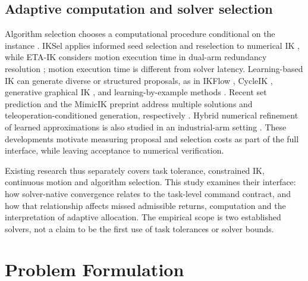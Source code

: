 \documentclass[10pt,a4paper]{article}
\begin{document}
\subsection{Adaptive computation and solver selection}

Algorithm selection chooses a computational procedure conditional on the instance
\cite{rice1976selection,bischl2016aslib}. IKSel applies informed seed selection
and reselection to numerical IK \cite{yuan2025iksel}, while ETA-IK considers
motion execution time in dual-arm redundancy resolution
\cite{tang2025etaik}; motion execution time is different from solver latency.
Learning-based IK can generate diverse or structured proposals, as in IKFlow
\cite{ames2022ikflow}, CycleIK \cite{habekost2023cycleik}, generative graphical
IK \cite{limoyo2025ggik}, and learning-by-example methods
\cite{demby2024learning}. Recent set prediction and the MimicIK preprint address
multiple solutions and teleoperation-conditioned generation, respectively
\cite{nguyen2026setik,yang2026mimik}.
Hybrid numerical refinement of learned approximations is also studied in an
industrial-arm setting \cite{jayabalan2026hybrid}.
These developments motivate measuring proposal and selection costs as part of
the full interface, while leaving acceptance to numerical verification.

Existing research thus separately covers task tolerance, constrained IK,
continuous motion and algorithm selection. This study examines their interface:
how solver-native convergence relates to the task-level command contract, and
how that relationship affects missed admissible returns, computation and the
interpretation of adaptive allocation. The empirical scope is two established
solvers, not a claim to be the first use of task tolerances or solver bounds.

\section{Problem Formulation}
\label{sec:problem}
\end{document}
